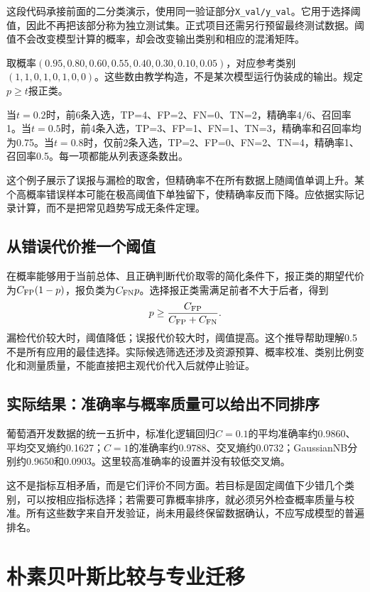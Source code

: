 这段代码承接前面的二分类演示，使用同一验证部分\texttt{X\_val/y\_val}。它用于选择阈值，因此不再把该部分称为独立测试集。正式项目还需另行预留最终测试数据。阈值不会改变模型计算的概率，却会改变输出类别和相应的混淆矩阵。

取概率$(0.95,0.80,0.60,0.55,0.40,0.30,0.10,0.05)$，对应参考类别$(1,1,0,1,0,1,0,0)$。这些数由教学构造，不是某次模型运行伪装成的输出。规定$p\ge t$报正类。

当$t=0.2$时，前6条入选，TP=4、FP=2、FN=0、TN=2，精确率$4/6$、召回率1。当$t=0.5$时，前4条入选，TP=3、FP=1、FN=1、TN=3，精确率和召回率均为0.75。当$t=0.8$时，仅前2条入选，TP=2、FP=0、FN=2、TN=4，精确率1、召回率0.5。每一项都能从列表逐条数出。


这个例子展示了误报与漏检的取舍，但精确率不在所有数据上随阈值单调上升。某个高概率错误样本可能在极高阈值下单独留下，使精确率反而下降。应依据实际记录计算，而不是把常见趋势写成无条件定理。

\subsection{从错误代价推一个阈值}
在概率能够用于当前总体、且正确判断代价取零的简化条件下，报正类的期望代价为$C_{\rm FP}(1-p)$，报负类为$C_{\rm FN}p$。选择报正类需满足前者不大于后者，得到
\[
p\ge\frac{C_{\rm FP}}{C_{\rm FP}+C_{\rm FN}}.
\]
漏检代价较大时，阈值降低；误报代价较大时，阈值提高。这个推导帮助理解0.5不是所有应用的最佳选择。实际候选筛选还涉及资源预算、概率校准、类别比例变化和测量质量，不能直接把主观代价代入后就停止验证。

\subsection{实际结果：准确率与概率质量可以给出不同排序}
葡萄酒开发数据的统一五折中，标准化逻辑回归$C=0.1$的平均准确率约0.9860、平均交叉熵约0.1627；$C=1$的准确率约0.9788、交叉熵约0.0732；GaussianNB分别约0.9650和0.0903。这里较高准确率的设置并没有较低交叉熵。

这不是指标互相矛盾，而是它们评价不同方面。若目标是固定阈值下少错几个类别，可以按相应指标选择；若需要可靠概率排序，就必须另外检查概率质量与校准。所有这些数字来自开发验证，尚未用最终保留数据确认，不应写成模型的普遍排名。

\section{朴素贝叶斯比较与专业迁移}

